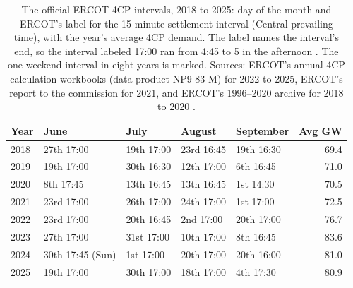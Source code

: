 \begin{table}[htbp]
  \centering
  \footnotesize
  \setlength{\tabcolsep}{3.5pt}
  \begin{tabular}{lllllr}
    \hline
    \textbf{Year} & \textbf{June} & \textbf{July} & \textbf{August} & \textbf{September} & \textbf{Avg GW} \\
    \hline
    2018 & 27th 17:00 & 19th 17:00 & 23rd 16:45 & 19th 16:30 & 69.4 \\
    2019 & 19th 17:00 & 30th 16:30 & 12th 17:00 & 6th 16:45 & 71.0 \\
    2020 & 8th 17:45 & 13th 16:45 & 13th 16:45 & 1st 14:30 & 70.5 \\
    2021 & 23rd 17:00 & 26th 17:00 & 24th 17:00 & 1st 17:00 & 72.5 \\
    2022 & 23rd 17:00 & 20th 16:45 & 2nd 17:00 & 20th 17:00 & 76.7 \\
    2023 & 27th 17:00 & 31st 17:00 & 10th 17:00 & 8th 16:45 & 83.6 \\
    2024 & 30th 17:45 (Sun) & 1st 17:00 & 20th 17:00 & 20th 16:00 & 81.0 \\
    2025 & 19th 17:00 & 30th 17:00 & 18th 17:00 & 4th 17:30 & 80.9 \\
    \hline
  \end{tabular}
  \caption{The official ERCOT 4CP intervals, 2018 to 2025: day of the month and ERCOT's label for the 15-minute settlement interval (Central prevailing time), with the year's average 4CP demand. The label names the interval's end, so the interval labeled 17:00 ran from 4:45 to 5 in the afternoon \autocite{ercot4cp2016puct}. The one weekend interval in eight years is marked. Sources: ERCOT's annual 4CP calculation workbooks (data product NP9-83-M) for 2022 to 2025, ERCOT's report to the commission for 2021, and ERCOT's 1996--2020 archive for 2018 to 2020 \autocite{ercotnp983m,ercot4cp2021puct,ercot4cphistzip}.} %
  \label{tab:fourcp-official}
\end{table}

